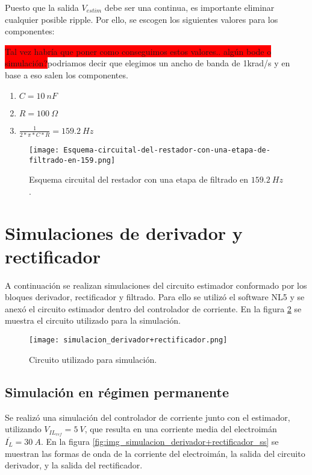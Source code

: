Puesto que la salida $V_{estim}$ debe ser una continua, es importante eliminar cualquier posible ripple. Por ello, se escogen los siguientes valores para los componentes:

\colorbox{red}{Tal vez habría que poner como conseguimos estos valores.. algún bode o simulación?}podriamos decir que elegimos un ancho de banda de 1krad/s y en base a eso salen los componentes.

\begin{enumerate}
	\item  $C=10\: nF$
	
	\item  $R=100\:\Omega$
	
	\item  $\frac{1}{2*\pi *C*R}=159.2\: Hz$
\end{enumerate}

\begin{figure}[H]
	\centering
	\texttt{[image: Esquema-circuital-del-restador-con-una-etapa-de-filtrado-en-159.png]}
	\caption{Esquema circuital del restador con una etapa de filtrado en $159.2\: Hz$.}
	\label{fig:img_Esquema-circuital-del-restador-con-una-etapa-de-filtrado-en-159}
\end{figure}


\section{Simulaciones de derivador y rectificador}

A continuación se realizan simulaciones del circuito estimador conformado por los bloques derivador, rectificador y filtrado. Para ello se utilizó el software NL5 y se anexó el circuito estimador dentro del controlador de corriente. En la figura \ref{fig:img_simulacion_derivador+rectificador} se muestra el circuito utilizado para la simulación.

\begin{figure}[H]
	\centering
	\texttt{[image: simulacion\_derivador+rectificador.png]}
	\caption{Circuito utilizado para simulación.}
	\label{fig:img_simulacion_derivador+rectificador}
\end{figure}

\subsection{Simulación en régimen permanente}

Se realizó una simulación del controlador de corriente junto con el estimador, utilizando $V_{IL_{ref}}=5\:V$, que resulta en una corriente media del electroimán $\overline{I_L}=30\:A$. En la figura \ref{fig:img_simulacion_derivador+rectificador_ss} se muestran las formas de onda de la corriente del electroimán, la salida del circuito derivador, y la salida del rectificador. 

